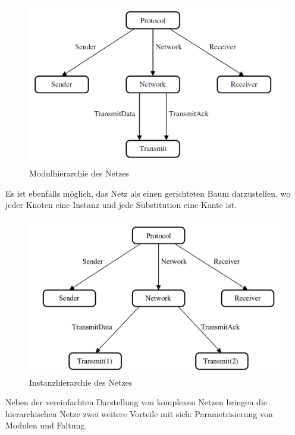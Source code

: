 \documentclass[11pt,onecolumn,a4paper,DIV=calc]{scrartcl}
\begin{document}
\begin{figure}[H]
    \centering
    \includegraphics[scale=0.46]{hier3.PNG}
    \caption{Modulhierarchie des Netzes}
    \label{hierarchy1}
\end{figure}
Es ist ebenfalls möglich, das Netz als einen gerichteten Baum darzustellen, wo jeder Knoten eine Instanz und jede Substitution eine Kante ist. 
\begin{figure} [H]
    \centering
    \includegraphics[scale=0.3]{hier.png}
    \caption{Instanzhierarchie des Netzes}
    \label{fig:my_label}
\end{figure}
Neben der vereinfachten Darstellung von komplexen Netzen bringen die hierarchischen Netze zwei weitere Vorteile mit sich: Parametrisierung von Modulen und Faltung.
\end{document}

